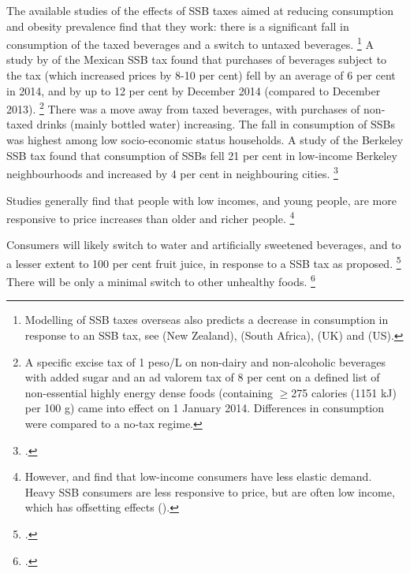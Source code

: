 \documentclass[embargoed]{grattan}
\begin{document}
The available studies of the effects of SSB taxes aimed at reducing consumption and obesity prevalence find that they work: there is a significant fall in consumption of the taxed beverages and a switch to untaxed beverages.%
\footnote{Modelling of SSB taxes overseas also predicts a decrease in consumption in response to an SSB tax, see \textcite{NiMhurchu2014Twentypercenttax} (New Zealand), \textcite{Manyema2014potentialimpact20} (South Africa), \textcite{Briggs2013Overallincomespecific} (UK) and \textcite{Long2015Costeffectivenesssugar} (US).} A study by \textcite{Colchero2016Beveragepurchasesstores} of the Mexican SSB tax found that purchases of beverages subject to the tax (which increased prices by 8-10 per cent) fell by an average of 6 per cent in 2014, and by up to 12 per cent by December 2014 (compared to December 2013).%
\footnote{A specific excise tax of 1 peso/L on non-dairy and non-alcoholic beverages with added sugar and an ad valorem tax of 8 per cent on a defined list of non-essential highly energy dense foods (containing \(\geq\)275 calories (1151 kJ) per 100 g) came into effect on 1 January 2014.
Differences in consumption were compared to a no-tax regime.} There was a move away from taxed beverages, with purchases of non-taxed drinks (mainly bottled water) increasing.
The fall in consumption of SSBs was highest among low socio-economic status households.
A study of the Berkeley SSB tax found that consumption of SSBs fell 21 per cent in low-income Berkeley neighbourhoods and increased by 4 per cent in neighbouring cities.%
\footcite{Falbe2016ImpactBerkeleyExcise}

Studies generally find that people with low incomes, and young people, are more responsive to price increases than older and richer people.%
\footnote{\textcites{Yang2016child}{Colchero2016Beveragepurchasesstores}{Organization2016FiscalPoliciesDiet}{Batis2016FirstYearEvaluation}{Sharma2014effectstaxingsugarsweetened}{Coalition2016Policybriefcase}{Friedman2012Sugarsweetenedbeverage}{Clements2015PriceElasticitiesFood} However, \textcite{Finkelstein2010EconomicsObesity} and \textcite{Lin2011Measuringweightoutcomes} find that low-income consumers have less elastic demand.
Heavy SSB consumers are less responsive to price, but are often low income, which has offsetting effects (\textcites{Organization2016FiscalPoliciesDiet}{Etile2015DoHighConsumers}).}

Consumers will likely switch to water and artificially sweetened beverages, and to a lesser extent to 100 per cent fruit juice, in response to a SSB tax as proposed.%
\footcites{Finkelstein2013Implicationssugarsweetened}{Colchero2016Beveragepurchasesstores}{LeBodo2016CanadianSodaTax}{Briggs2013Overallincomespecific} There will be only a minimal switch to other unhealthy foods.%
\footcite{Finkelstein2013Implicationssugarsweetened}
\end{document}
